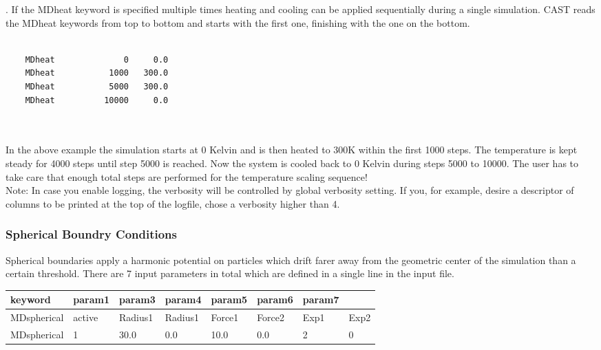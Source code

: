 \documentclass[10pt,a4paper]{article} %
\newif\ifverbose %
\newif\ifdevmode %
\begin{document}
	\ifverbose
	\subsubsection{Heating}
	Note: The settings for MDheat can be applied multiple times. The first number indicates the snapshot number, the second one the desired temperature at this snapshot. During the heating process the thermostat is disabled and a simple velocity scaling is used to heat the system \ifdevmode \colorbox{red}{is this smart? should we improve this?} \fi. If the MDheat keyword is specified multiple times heating and cooling can be applied sequentially during a single simulation. \ac{CAST} reads the MDheat keywords from top to bottom and starts with the first one, finishing with the one on the bottom.\\~\\
	\begin{lstlisting}
	MDheat			    0  	  0.0
	MDheat 			 1000   300.0
	MDheat			 5000   300.0
	MDheat			10000     0.0
	\end{lstlisting}~\\~\\
	In the above example the simulation starts at 0 Kelvin and is then heated to 300K within the first 1000 steps. The temperature is kept steady for 4000 steps until step 5000 is reached. Now the system is cooled back to 0 Kelvin during steps 5000 to 10000. The user has to take care that enough total steps are performed for the temperature scaling sequence!\\
		
	Note: In case you enable logging, the verbosity will be controlled by global verbosity setting. If you, for example, desire a descriptor of columns to be printed at the top of the logfile, chose a verbosity higher than 4. \\
	
	\subsubsection{Spherical Boundry Conditions}
	Spherical boundaries apply a harmonic potential on particles which drift farer away from the geometric center of the simulation than a certain threshold. There are 7 input parameters in total which are defined in a single line in the input file. \\
		
	\begin{tabularx}{\textwidth}{l|X|X|X|X|X|X|X}
		keyword & param1 & param3 & param4 & param5 & param6 & param7 \\
		\hline
		MDspherical & active & Radius1 & Radius1 & Force1 & Force2 & Exp1 & Exp2 \\
		MDspherical & 1 & 30.0 & 0.0 & 10.0 & 0.0 & 2 & 0 \\
	\end{tabularx}~\\
		
\end{document}
